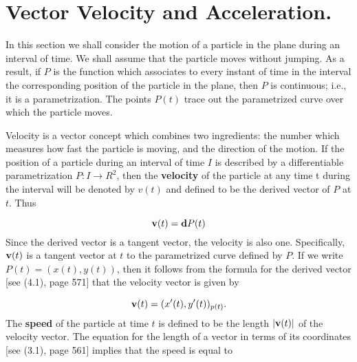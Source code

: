 \section{Vector Velocity and Acceleration.} In this section we shall consider the motion of a particle in the plane during an interval of time. We shall assume that the particle moves without jumping. As a result, if $P$ is the function which associates to every instant of time in the interval the corresponding position of the particle in the plane, then $P$ is continuous; i.e., it is a parametrization. The points $P(t)$ trace out the parametrized curve over which the particle moves.

Velocity is a vector concept which combines two ingredients: the number which measures how fast the particle is moving, and the direction of the motion. If the position of a particle during an interval of time $I$ is described by a differentiable parametrization $P: I \rightarrow R^2$, then the \textbf{velocity} of the particle at any time t during the interval will be denoted by $v(t)$ and defined to be the derived vector of $P$ at $t$. Thus

\begin{equation}
\mbox{\bf{v}}(t) = \mbox{\bf{d}}P(t)   
\label{eq10.5.1}
\end{equation}
Since the derived vector is a tangent vector, the velocity is also one. Specifically, $\mbox{\bf{v}}(t)$ is a tangent vector at $t$ to the parametrized curve defined by $P$. If we write $P(t) = (x(t), y(t))$, then it follows from the formula for the derived vector [see (4.1), page 571] that the velocity vector is given by

\begin{equation}
\mbox{\bf{v}}(t) = (x'(t), y'(t))_{p(t)}.  
\label{eq10.5.2}
\end{equation}
The \textbf{speed} of the particle at time $t$ is defined to be the length $|\mbox{\bf{v}}(t)|$ of the velocity vector. The equation for the length of a vector in terms of its coordinates [see (3.1), page 561] implies that the speed is equal to

